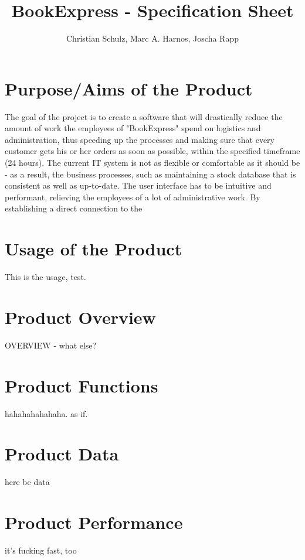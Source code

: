 \documentclass[a4paper]{report}
\author{Christian Schulz, Marc A. Harnos, Joscha Rapp}
\begin{document}
\title{BookExpress - Specification Sheet}
\maketitle
\tableofcontents

\chapter{Purpose/Aims of the Product}
\let\clearpage\relax
The goal of the project is to create a software that will drastically reduce the amount of work the employees of "BookExpress" spend on logistics and administration, thus speeding up the processes and making sure that every customer gets his or her orders as soon as possible, within the specified timeframe (24 hours). The current IT system is not as flexible or comfortable as it should be - as a result, the business processes, such as maintaining a stock database that is consistent as well as up-to-date. The user interface has to be intuitive and performant, relieving the employees of a lot of administrative work. By establishing a direct connection to the 
\\
\chapter{Usage of the Product}
This is the usage, test.	
\chapter{Product Overview}
OVERVIEW - what else?
\chapter{Product Functions}
hahahahahahaha. as if.
\chapter{Product Data}
here be data
\chapter{Product Performance}
it's fucking fast, too
\end{document}
